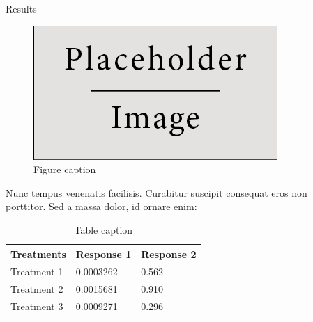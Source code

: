 \documentclass[final]{beamer}
\newlength{\sepwid}
\newlength{\onecolwid}
\newlength{\twocolwid}
\begin{document}
\begin{frame}[t]
\begin{columns}[t]
\begin{column}{\twocolwid}
\begin{columns}[t,totalwidth=\twocolwid]
\begin{column}{\onecolwid}
\begin{block}{Results}

\begin{figure}
\includegraphics[width=0.8\linewidth]{fig/placeholder.jpg}
\caption{Figure caption}
\end{figure}

Nunc tempus venenatis facilisis. Curabitur suscipit consequat eros non porttitor. Sed a massa dolor, id ornare enim:

\begin{table}
\vspace{2ex}
\begin{tabular}{l l l}
\toprule
\textbf{Treatments} & \textbf{Response 1} & \textbf{Response 2}\\
\midrule
Treatment 1 & 0.0003262 & 0.562 \\
Treatment 2 & 0.0015681 & 0.910 \\
Treatment 3 & 0.0009271 & 0.296 \\
\bottomrule
\end{tabular}
\caption{Table caption}
\end{table}

\end{block}


\end{column} %

\end{columns} %

\end{column} %

\begin{column}{\sepwid}\end{column} %

\begin{column}{\onecolwid} %


\end{column}
\end{columns}
\end{frame}
\end{document}
